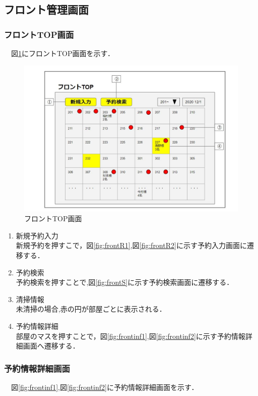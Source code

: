 

\subsection{フロント管理画面}

\subsubsection{フロントTOP画面}
　図\ref{fig:frontTop}にフロントTOP画面を示す．

\begin{figure}[H]
 \centering
   \includegraphics[width=120mm]{UI_front/frontTop.jpg}
 \caption{フロントTOP画面}
 \label{fig:frontTop}
\end{figure}

\begin{enumerate}
\renewcommand{\labelenumi}{\textcircled{\scriptsize \theenumi}}
\item 新規予約入力\\ 新規予約を押すこで，図\ref{fig:frontR1},図\ref{fig:frontR2}に示す予約入力画面に遷移する．
\item 予約検索\\ 予約検索を押すことで,図\ref{fig:frontS}に示す予約検索画面に遷移する．
\item 清掃情報\\未清掃の場合,赤の円が部屋ごとに表示される．
\item 予約情報詳細\\部屋のマスを押すことで，図\ref{fig:frontinf1},図\ref{fig:frontinf2}に示す予約情報詳細画面へ遷移する．
\end{enumerate}


\subsubsection{予約情報詳細画面}
　図\ref{fig:frontinf1},図\ref{fig:frontinf2}に予約情報詳細画面を示す．

